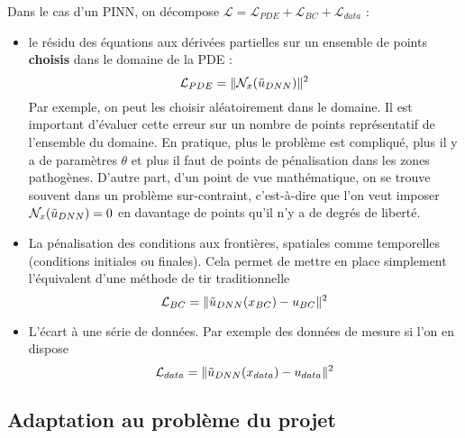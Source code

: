Dans le cas d'un PINN, on décompose $\mathcal{L} = \mathcal{L}_{PDE} + \mathcal{L}_{BC} + \mathcal{L}_{data}$ :
\begin{itemize}
    \item le résidu des équations aux dérivées partielles sur un ensemble de points \textbf{choisis} dans le domaine de la PDE :
    \begin{equation}
        \mathcal{L}_{PDE} = \| \mathcal{N}_x(\Tilde{u}_{DNN})\|^2
    \end{equation}
    Par exemple, on peut les choisir aléatoirement dans le domaine. Il est important d'évaluer cette erreur sur un nombre de points représentatif de l'ensemble du domaine. En pratique, plus le problème est compliqué, plus il y a de paramètres $\theta$ et plus il faut de points de pénalisation dans les zones \og pathogènes\fg{}. D'autre part, d'un point de vue mathématique, on se trouve souvent dans un problème sur-contraint, c'est-à-dire que l'on veut imposer $\mathcal{N}_x(\Tilde{u}_{DNN})=0$ en davantage de points qu'il n'y a de degrés de liberté.
    \item La pénalisation des conditions aux frontières, spatiales comme temporelles (conditions initiales ou finales). Cela permet de mettre en place \og simplement\fg{} l'équivalent d'une méthode de tir traditionnelle
        \begin{equation}
        \mathcal{L}_{BC} = \| \Tilde{u}_{DNN}(x_{BC}) - u_{BC}\|^2
    \end{equation}
    \item L'écart à une série de données. Par exemple des données de mesure si l'on en dispose 
        \begin{equation}
        \mathcal{L}_{data} = \| \Tilde{u}_{DNN}(x_{data}) - u_{data}\|^2
    \end{equation}
\end{itemize}



\subsection{Adaptation au problème du projet}

